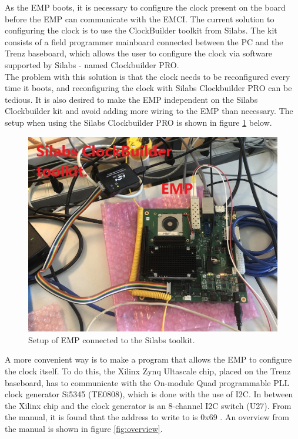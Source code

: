 As the EMP boots, it is necessary to configure the clock present on the board before the EMP can communicate with the EMCI. The current solution to configuring the clock is to use the ClockBuilder toolkit from Silabs. The kit consists of a field programmer mainboard connected between the PC and the Trenz baseboard, which allows the user to configure the clock via software supported by Silabs - named Clockbuilder PRO.\\

\noindent The problem with this solution is that the clock needs to be reconfigured every time it boots, and reconfiguring the clock with Silabs Clockbuilder PRO can be tedious. It is also desired to make the EMP independent on the Silabs Clockbuilder kit and avoid adding more wiring to the EMP than necessary. The setup when using the Silabs Clockbuilder PRO is shown in figure \ref{fig:Silabstoolkit} below. 

\begin{figure}[H]
    \centering
    \includegraphics[width=.75\textwidth]{Graphics/IMG_0312.jpg}
    \caption{Setup of EMP connected to the Silabs toolkit.}
    \label{fig:Silabstoolkit}
\end{figure}


\noindent A more convenient way is to make a program that allows the EMP to configure the clock itself. To do this, the Xilinx Zynq Ultascale chip, placed on the Trenz baseboard, has to communicate with the On-module Quad programmable PLL clock generator Si5345 (TE0808), which is done with the use of I2C. In between the Xilinx chip and the clock generator is an 8-channel I2C switch (U27). From the manual, it is found that the address to write to is 0x69 \cite{TEBF080828:online}. An overview from the manual is shown in figure \ref{fig:overview}.

